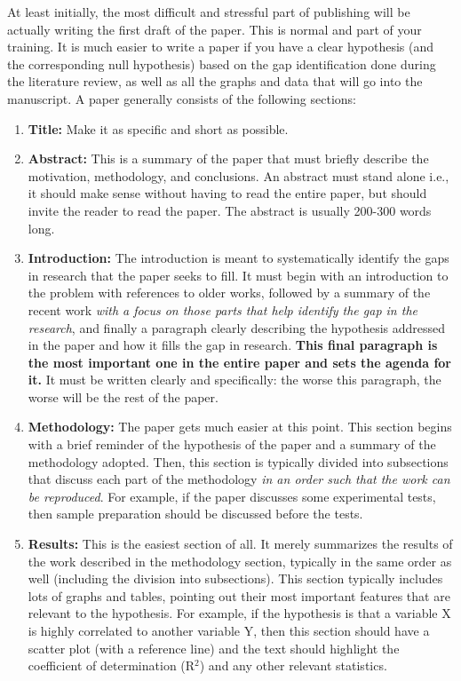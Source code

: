 \documentclass[12pt]{article}
\begin{document}
At least initially, the most difficult and stressful part of publishing will be actually writing the first draft of the paper. This is normal and part of your training. It is much easier to write a paper if you have a clear hypothesis (and the corresponding null hypothesis) based on the gap identification done during the literature review, as well as all the graphs and data that will go into the manuscript. A paper generally consists of the following sections:

\begin{enumerate}
	\item \textbf{Title:} Make it as specific and short as possible.
	\item \textbf{Abstract:} This is a summary of the paper that must briefly describe the motivation, methodology, and conclusions. An abstract must stand alone i.e., it should make sense without having to read the entire paper, but should invite the reader to read the paper. The abstract is usually 200-300 words long.
	\item \textbf{Introduction:} The introduction is meant to systematically identify the gaps in research that the paper seeks to fill. It must begin with an introduction to the problem with references to older works, followed by a summary of the recent work \textit{with a focus on those parts that help identify the gap in the research}, and finally a paragraph clearly describing the hypothesis addressed in the paper and how it fills the gap in research. \textbf{This final paragraph is the most important one in the entire paper and sets the agenda for it.} It must be written clearly and specifically: the worse this paragraph, the worse will be the rest of the paper. 
	\item \textbf{Methodology:} The paper gets much easier at this point. This section begins with a brief reminder of the hypothesis of the paper and a summary of the methodology adopted. Then, this section is typically divided into subsections that discuss each part of the methodology \textit{in an order such that the work can be reproduced}. For example, if the paper discusses some experimental tests, then sample preparation should be discussed before the tests.
	\item \textbf{Results:} This is the easiest section of all. It merely summarizes the results of the work described in the methodology section, typically in the same order as well (including the division into subsections). This section typically includes lots of graphs and tables, pointing out their most important features that are relevant to the hypothesis. For example, if the hypothesis is that a variable X is highly correlated to another variable Y, then this section should have a scatter plot (with a reference line) and the text should highlight the coefficient of determination (R$^2$) and any other relevant statistics.

\end{enumerate}
\end{document}
